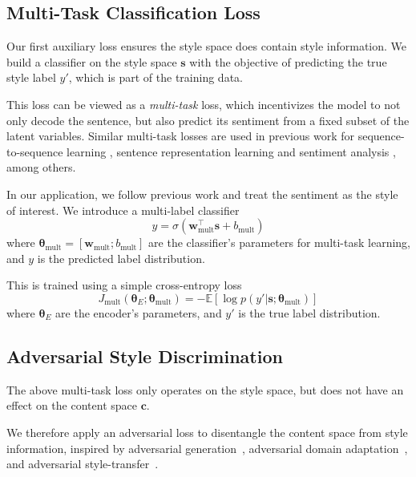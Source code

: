 \documentclass[letterpaper]{article} %
\newcommand{\loss}[1]{J_\text{#1}}
\begin{document}
\subsection{Multi-Task Classification Loss} \label{ssec:multitask-classification-objective}

Our first auxiliary loss ensures the style space does contain style information. We build a classifier on the style space $\bm s$ with the objective of predicting the true style label $y'$, which is part of the training data.

This loss can be viewed as a \textit{multi-task} loss, which incentivizes the model to not only decode the sentence, but also predict its sentiment from a fixed subset of the latent variables. Similar multi-task losses are used in previous work for sequence-to-sequence learning \cite{luong2015multi}, sentence representation learning \cite{jernite2017discourse} and sentiment analysis \cite{balikas2017multitask}, among others.

In our application, we follow previous work \cite{hu2017toward,shen2017style,fu2017style} and treat the sentiment as the style of interest. We introduce a multi-label classifier
\begin{equation} \label{eqn:class-pred}
	y = \sigma(\bm w_\text{mult}^\top \bm s + b_\text{mult})
\end{equation}
where $\bm\theta_\text{mult}=[\bm w_\text{mult}; b_\text{mult}]$ are the classifier's parameters for multi-task learning, and $y$ is the predicted label distribution.

This is trained using a simple cross-entropy loss
\begin{equation} \label{eqn:multi-task-loss}
	\loss{mult}(\bm\theta_{E};\bm\theta_\text{mult}) =
	- \mathbb{E} [\log p(y' | \bm s; \bm\theta_\text{mult})]
\end{equation}
where $\bm\theta_E$ are the encoder's parameters, and $y'$ is the true label distribution.


\subsection{Adversarial Style Discrimination} \label{ssec:adversarial-style-objective}

The above multi-task loss only operates on the style space, but does not have an effect on the content space $\bm c$.

We therefore apply an adversarial loss to disentangle the content space from style information, inspired by adversarial generation~\cite{goodfellow2014generative}, adversarial domain adaptation~\cite{liu2017adversarial}, and adversarial style-transfer~\cite{fu2017style}.
\end{document}
